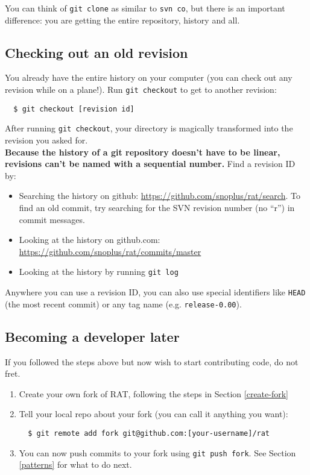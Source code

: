 \documentclass{article}
\begin{document}
You can think of {\tt git clone} as similar to {\tt svn co}, but there is an important difference: you are getting the entire repository, history and all.

\subsection{Checking out an old revision}
You already have the entire history on your computer (you can check out any revision while on a plane!). Run {\tt git checkout} to get to another revision:
\begin{verbatim}
  $ git checkout [revision id]
\end{verbatim}
After running {\tt git checkout}, your directory is magically transformed into the revision you asked for.\\

{\bf Because the history of a git repository doesn't have to be linear, revisions can't be named with a sequential number.} Find a revision ID by:
\begin{itemize}
\item Searching the history on github: \href{https://github.com/snoplus/rat/search}{https://github.com/snoplus/rat/search}. To find an old commit, try searching for the SVN revision number (no ``r'') in commit messages.
\item Looking at the history on github.com: \href{https://github.com/snoplus/rat/commits/master}{https://github.com/snoplus/rat/commits/master}
\item Looking at the history by running {\tt git log}
\end{itemize}

Anywhere you can use a revision ID, you can also use special identifiers like {\tt HEAD} (the most recent commit) or any tag name (e.g. {\tt release-0.00}).

\subsection{Becoming a developer later}
If you followed the steps above but now wish to start contributing code, do not fret.
\begin{enumerate}
\item Create your own fork of RAT, following the steps in Section \ref{create-fork}
\item Tell your local repo about your fork (you can call it anything you want):
\begin{verbatim}
  $ git remote add fork git@github.com:[your-username]/rat
\end{verbatim}
\item You can now push commits to your fork using {\tt git push fork}. See Section \ref{patterns} for what to do next.
\end{enumerate}
\end{document}
